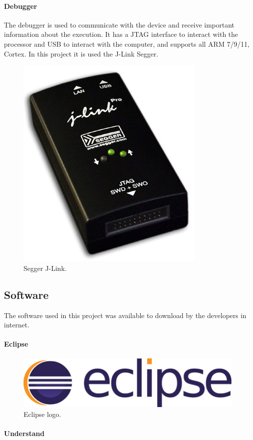 \documentclass{report}
\begin{document}
		\paragraph{Debugger} The debugger is used to communicate with the device and receive important information about the execution. It has a JTAG interface to interact with the processor and USB to interact with the computer, and supports all ARM 7/9/11, Cortex. In this project it is used the J-Link Segger. 
		
			\begin{figure} [!h]
				\centering
				\includegraphics[width=0.3\linewidth]{Images/jlink}
				\caption{Segger J-Link.}
				\label{fig:jlink}
			\end{figure}

		\subsection{Software}
		
		\par The software used in this project was available to download by the developers in internet. 
		
			\paragraph{Eclipse}
			
			\par 

			\begin{figure} [!h]
				\centering
				\includegraphics[width=0.3\linewidth]{Images/eclipse}
				\caption{Eclipse logo.}
				\label{fig:eclipse}
			\end{figure}

			\paragraph{Understand}
			
\end{document}
